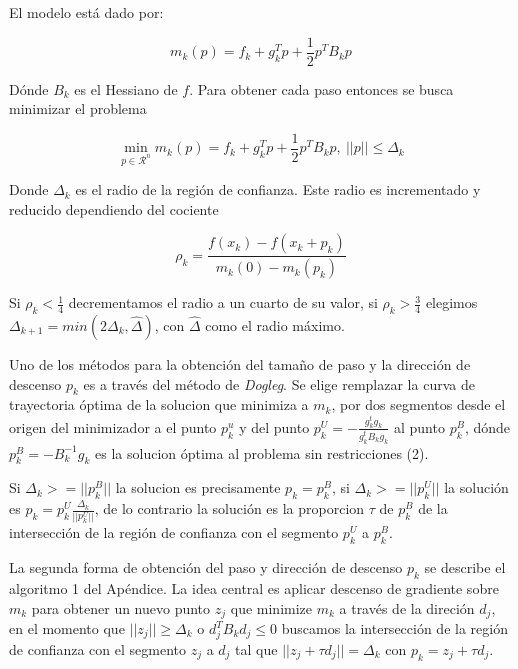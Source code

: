 \documentclass[conference]{IEEEtran}
\begin{document}
El modelo está dado por:

\begin{equation}
	m_k(p) = f_k + g_k^Tp + \frac{1}{2}p^TB_kp
\end{equation}

Dónde $B_k$ es el Hessiano de $f$. Para obtener cada paso entonces se busca minimizar el problema

\begin{equation}
	\min_{p \in \mathcal{R}^n}  m_k(p) = f_k + g_k^Tp + \frac{1}{2}p^TB_kp,\ ||p|| \le \Delta_k
\end{equation}

Donde $\Delta_k$ es el radio de la región de confianza.  Este radio es incrementado y reducido
dependiendo del cociente

\begin{equation}
	\rho_k = \frac{f(x_k) - f(x_k + p_k)}{m_k(0) - m_k(p_k)}
\end{equation}

Si $\rho_k < \frac{1}{4}$ decrementamos el radio a un cuarto de su valor, si $\rho_k > \frac{3}{4}$
elegimos $\Delta_{k+1} = min(2\Delta_k, \hat{\Delta})$, con $\hat{\Delta}$ como el radio máximo.

Uno de los métodos para la obtención del tamaño de paso y la dirección de descenso $p_k$ es a través
del método de \textit{Dogleg}. Se elige remplazar la curva de trayectoria óptima de la solucion que
minimiza a $m_k$, por dos segmentos desde el origen del minimizador a el punto $p^u_k$ y del punto
$p_k^U = - \frac{g_k^tg_k}{g_k^tB_kg_k}$ al punto $p_k^B$, dónde $p_k^B = -B_k^{-1} g_k$ es la
solucion óptima al problema sin restricciones (2).

Si $\Delta_k >= ||p_k^B||$ la solucion es precisamente $p_k = p_k^B$, si $\Delta_k >= ||p_k^U||$ la
solución es $p_k = p_k^U \frac{\Delta_k}{||p_k^U||}$, de lo contrario la solución es la proporcion
$\tau$ de $p_k^B$ de la intersección de la región de confianza con el segmento $p_k^U$ a $p_k^B$.

La segunda forma de obtención del paso y dirección de descenso $p_k$ se describe el algoritmo 1
del Apéndice. La idea central es aplicar descenso de gradiente sobre $m_k$ para obtener un nuevo
punto $z_j$ que minimize $m_k$ a través de la direción $d_j$, en el momento que
$||z_j|| \ge \Delta_k$ o $d_j^TB_kd_j \le 0$ buscamos la intersección de la región de confianza con
el segmento $z_j$ a $d_j$ tal que $||z_j + \tau d_j|| = \Delta_k$ con $p_k = z_j + \tau d_j$.\\
\end{document}
